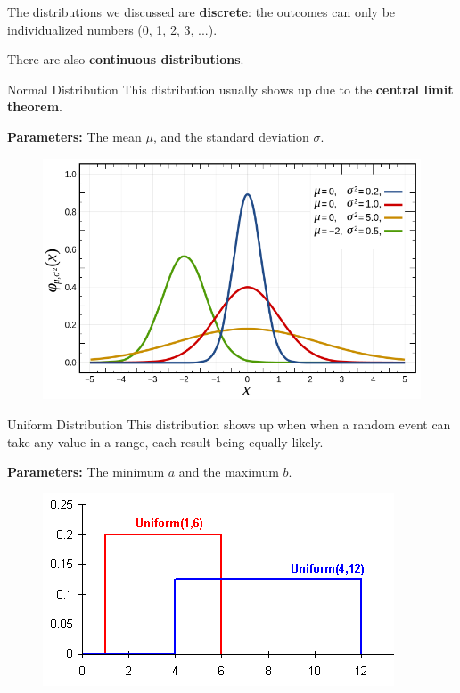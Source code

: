 %
\begin{frame}

The distributions we discussed are \textbf{discrete}: the outcomes can only be
individualized numbers (0, 1, 2, 3, ...).  

\hfill

There are also \textbf{continuous distributions}.


\end{frame}
%

%
\begin{frame}{Normal Distribution}
This distribution usually shows up due to the \textbf{central limit theorem}.

\hfill

\textbf{Parameters:} The mean $\mu$, and the standard deviation $\sigma$.

  \begin{figure}
    \includegraphics[scale=0.25]{normal-pdf}
  \end{figure}

\end{frame}
%

%
\begin{frame}{Uniform Distribution}
This distribution shows up when when a random event can take any value in a
range, each result being equally likely.

\hfill

\textbf{Parameters:} The minimum $a$ and the maximum $b$.

  \begin{figure}
    \includegraphics[scale=0.5]{uniform-pdf}
  \end{figure}

\end{frame}
%

